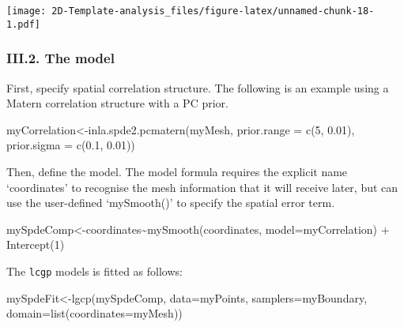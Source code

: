\documentclass[
]{article}
\newenvironment{Shaded}{\begin{snugshade}}{\end{snugshade}}
\newcommand{\AttributeTok}[1]{\textcolor[rgb]{0.77,0.63,0.00}{#1}}
\newcommand{\DecValTok}[1]{\textcolor[rgb]{0.00,0.00,0.81}{#1}}
\newcommand{\FloatTok}[1]{\textcolor[rgb]{0.00,0.00,0.81}{#1}}
\newcommand{\FunctionTok}[1]{\textcolor[rgb]{0.00,0.00,0.00}{#1}}
\newcommand{\NormalTok}[1]{#1}
\newcommand{\OtherTok}[1]{\textcolor[rgb]{0.56,0.35,0.01}{#1}}
\newcommand{\SpecialCharTok}[1]{\textcolor[rgb]{0.00,0.00,0.00}{#1}}
\begin{document}
\texttt{[image: 2D-Template-analysis\_files/figure-latex/unnamed-chunk-18-1.pdf]}

\hypertarget{iii.2.-the-model}{%
\subsubsection{III.2. The model}\label{iii.2.-the-model}}

First, specify spatial correlation structure. The following is an
example using a Matern correlation structure with a PC prior.

\begin{Shaded}
\begin{Highlighting}[]
\NormalTok{myCorrelation}\OtherTok{\textless{}{-}}\FunctionTok{inla.spde2.pcmatern}\NormalTok{(myMesh, }\AttributeTok{prior.range =} \FunctionTok{c}\NormalTok{(}\DecValTok{5}\NormalTok{, }\FloatTok{0.01}\NormalTok{), }\AttributeTok{prior.sigma =} \FunctionTok{c}\NormalTok{(}\FloatTok{0.1}\NormalTok{, }\FloatTok{0.01}\NormalTok{))}
\end{Highlighting}
\end{Shaded}

Then, define the model. The model formula requires the explicit name
`coordinates' to recognise the mesh information that it will receive
later, but can use the user-defined `mySmooth()' to specify the spatial
error term.

\begin{Shaded}
\begin{Highlighting}[]
\NormalTok{mySpdeComp}\OtherTok{\textless{}{-}}\NormalTok{coordinates}\SpecialCharTok{\textasciitilde{}}\FunctionTok{mySmooth}\NormalTok{(coordinates, }\AttributeTok{model=}\NormalTok{myCorrelation) }\SpecialCharTok{+} \FunctionTok{Intercept}\NormalTok{(}\DecValTok{1}\NormalTok{)}
\end{Highlighting}
\end{Shaded}

The \texttt{lcgp} models is fitted as follows:

\begin{Shaded}
\begin{Highlighting}[]
\NormalTok{mySpdeFit}\OtherTok{\textless{}{-}}\FunctionTok{lgcp}\NormalTok{(mySpdeComp, }\AttributeTok{data=}\NormalTok{myPoints, }\AttributeTok{samplers=}\NormalTok{myBoundary, }\AttributeTok{domain=}\FunctionTok{list}\NormalTok{(}\AttributeTok{coordinates=}\NormalTok{myMesh))}
\end{Highlighting}
\end{Shaded}
\end{document}
